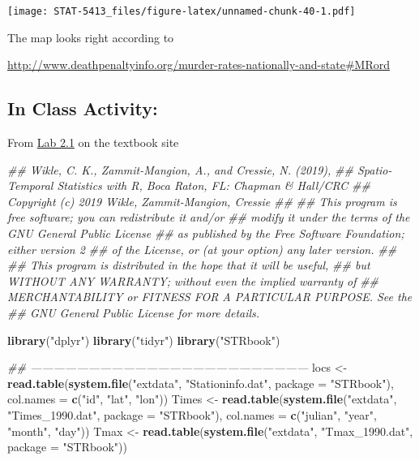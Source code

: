 \documentclass[]{book}
\newenvironment{Shaded}{\begin{snugshade}}{\end{snugshade}}
\newcommand{\CommentTok}[1]{\textcolor[rgb]{0.56,0.35,0.01}{\textit{#1}}}
\newcommand{\DataTypeTok}[1]{\textcolor[rgb]{0.13,0.29,0.53}{#1}}
\newcommand{\KeywordTok}[1]{\textcolor[rgb]{0.13,0.29,0.53}{\textbf{#1}}}
\newcommand{\NormalTok}[1]{#1}
\newcommand{\StringTok}[1]{\textcolor[rgb]{0.31,0.60,0.02}{#1}}
\begin{document}
\texttt{[image: STAT-5413\_files/figure-latex/unnamed-chunk-40-1.pdf]}

The map looks right according to

\url{http://www.deathpenaltyinfo.org/murder-rates-nationally-and-state\#MRord}

\hypertarget{in-class-activity}{%
\subsection{In Class Activity:}\label{in-class-activity}}

From \href{https://spacetimewithr.org/code}{Lab 2.1} on the textbook site

\begin{Shaded}
\begin{Highlighting}[]
\CommentTok{## Wikle, C. K., Zammit-Mangion, A., and Cressie, N. (2019), }
\CommentTok{## Spatio-Temporal Statistics with R, Boca Raton, FL: Chapman & Hall/CRC}
\CommentTok{## Copyright (c) 2019 Wikle, Zammit-Mangion, Cressie}
\CommentTok{##}
\CommentTok{## This program is free software; you can redistribute it and/or}
\CommentTok{## modify it under the terms of the GNU General Public License}
\CommentTok{## as published by the Free Software Foundation; either version 2}
\CommentTok{## of the License, or (at your option) any later version.}
\CommentTok{##}
\CommentTok{## This program is distributed in the hope that it will be useful,}
\CommentTok{## but WITHOUT ANY WARRANTY; without even the implied warranty of}
\CommentTok{## MERCHANTABILITY or FITNESS FOR A PARTICULAR PURPOSE.  See the}
\CommentTok{## GNU General Public License for more details.}

\KeywordTok{library}\NormalTok{(}\StringTok{"dplyr"}\NormalTok{)}
\KeywordTok{library}\NormalTok{(}\StringTok{"tidyr"}\NormalTok{)}
\KeywordTok{library}\NormalTok{(}\StringTok{"STRbook"}\NormalTok{)}

\CommentTok{## ------------------------------------------------------------------------}
\NormalTok{locs <-}\StringTok{ }\KeywordTok{read.table}\NormalTok{(}\KeywordTok{system.file}\NormalTok{(}\StringTok{"extdata"}\NormalTok{, }\StringTok{"Stationinfo.dat"}\NormalTok{,}
                               \DataTypeTok{package =} \StringTok{"STRbook"}\NormalTok{),}
                   \DataTypeTok{col.names =} \KeywordTok{c}\NormalTok{(}\StringTok{"id"}\NormalTok{, }\StringTok{"lat"}\NormalTok{, }\StringTok{"lon"}\NormalTok{))}
\NormalTok{Times <-}\StringTok{ }\KeywordTok{read.table}\NormalTok{(}\KeywordTok{system.file}\NormalTok{(}\StringTok{"extdata"}\NormalTok{, }\StringTok{"Times_1990.dat"}\NormalTok{,}
                                \DataTypeTok{package =} \StringTok{"STRbook"}\NormalTok{),}
                    \DataTypeTok{col.names =} \KeywordTok{c}\NormalTok{(}\StringTok{"julian"}\NormalTok{, }\StringTok{"year"}\NormalTok{, }\StringTok{"month"}\NormalTok{, }\StringTok{"day"}\NormalTok{))}
\NormalTok{Tmax <-}\StringTok{ }\KeywordTok{read.table}\NormalTok{(}\KeywordTok{system.file}\NormalTok{(}\StringTok{"extdata"}\NormalTok{, }\StringTok{"Tmax_1990.dat"}\NormalTok{,}
                               \DataTypeTok{package =} \StringTok{"STRbook"}\NormalTok{))}


\end{Highlighting}
\end{Shaded}
\end{document}
